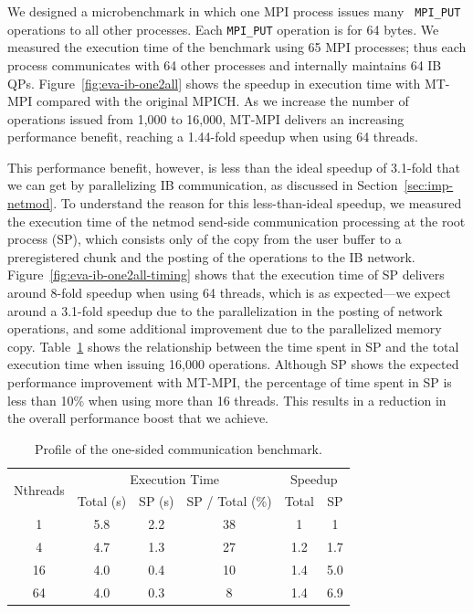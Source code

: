 We designed a microbenchmark in which one MPI process issues many {\tt
  MPI\_PUT} operations to all other processes.  Each \texttt{MPI\_PUT}
operation is for 64 bytes.  We measured the execution time of the
benchmark using 65 MPI processes; thus each process communicates with
64 other processes and internally maintains 64 IB QPs.
Figure~\ref{fig:eva-ib-one2all} shows the speedup in execution time
with MT-MPI compared with the original MPICH.  As we increase the
number of operations issued from 1,000 to 16,000, MT-MPI delivers an
increasing performance benefit, reaching a 1.44-fold speedup when
using 64 threads.

This performance benefit, however, is less than the ideal speedup of
3.1-fold that we can get by parallelizing IB communication, as
discussed in Section~\ref{sec:imp-netmod}.  To understand the reason
for this less-than-ideal speedup, we measured the execution time of
the netmod send-side communication processing at the root process
(SP), which consists only of the copy from the user buffer to a
preregistered chunk and the posting of the operations to the IB
network.  Figure~\ref{fig:eva-ib-one2all-timing} shows that the
execution time of SP delivers around 8-fold speedup when using 64
threads, which is as expected---we expect around a 3.1-fold speedup
due to the parallelization in the posting of network operations, and
some additional improvement due to the parallelized memory copy.
Table~\ref{tab:eva-ib-one2all-timing} shows the relationship between
the time spent in SP and the total execution time when issuing 16,000
operations.  Although SP shows the expected performance improvement
with MT-MPI, the percentage of time spent in SP is less than 10\% when
using more than 16 threads.  This results in a reduction in the
overall performance boost that we achieve.

\begin{table}\scriptsize
\vspace{2.0ex}
\begin{center}
\caption{Profile of the one-sided communication
  benchmark.}\label{tab:eva-ib-one2all-timing}
\vspace{-2.0ex}
\begin{tabular}{|c|ccc|cc|}
\hline
\multirow{2}{*}{Nthreads} &
\multicolumn{3}{c|}{Execution Time} &
\multicolumn{2}{c|}{Speedup} \\
\cline{2-6}
  & Total (s) & SP (s) & SP / Total ({\%}) & Total & SP \\
\hline
1 & 5.8 & 2.2 & 38 & 1 & 1 \\
4 & 4.7 & 1.3 & 27 & 1.2 & 1.7 \\
16 & 4.0 & 0.4 & 10 & 1.4 & 5.0 \\
64 & 4.0 & 0.3 & 8 & 1.4 & 6.9 \\
\hline
\end{tabular}
\end{center}
\vspace{-4.0ex}
\end{table}

